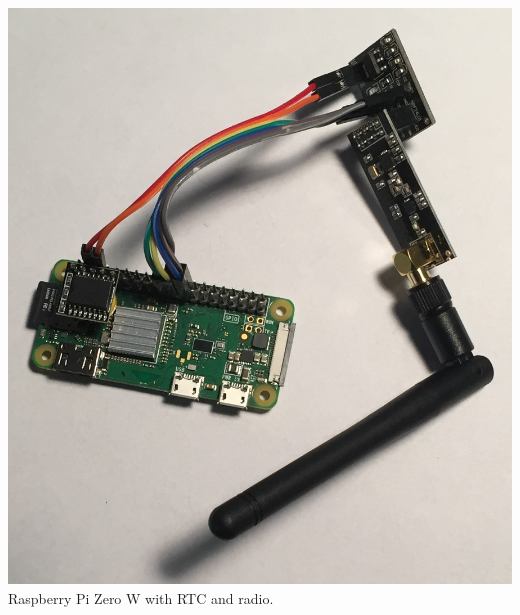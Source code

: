 \documentclass[12pt]{article}
\begin{document}
\begin{center}
	\includegraphics[width=6in]{RPi_Assembled}\\
	Raspberry Pi Zero W with RTC and radio.
\end{center}
\end{document}
